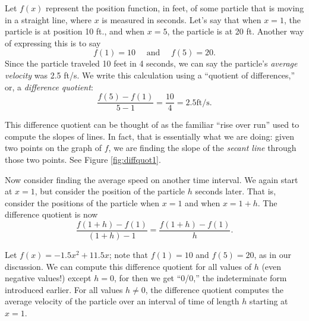 
Let $f(x)$ represent the position function, in feet, of some particle that is moving in a straight line, where $x$ is measured in seconds. Let's say that when $x=1$, the particle is at position 10 ft., and when $x=5$, the particle is at 20 ft. Another way of expressing this is to say $$f(1)=10 \quad \text{ and } \quad f(5) = 20.$$
Since the particle traveled 10 feet in 4 seconds, we can say the particle's \textit{average velocity} was 2.5 ft/s. We write this calculation using a ``quotient of differences,'' or, a \textit{difference quotient}: $$\frac{f(5) - f(1)}{5-1} = \frac{10}4 = 2.5 \text{ft/s}.$$

This difference quotient can be thought of as the familiar ``rise over run'' used to compute the slopes of lines. In fact, that is essentially what we are doing: given two points on the graph of $f$, we are finding the slope of the \textit{secant line} through those two points. See Figure \ref{fig:diffquot1}.

Now consider finding the average speed on another time interval. We again start at $x=1$, but consider the position of the particle $h$ seconds later. That is, consider the positions of the particle when $x=1$ and when $x=1+h$. The difference quotient is now $$\frac{f(1+h)-f(1)}{(1+h)-1} = \frac{f(1+h)-f(1)}h.$$

Let $f(x) = -1.5x^2+11.5x$; note that $f(1)=10$ and $f(5) = 20$, as in our discussion. We can compute this difference quotient for all values of $h$ (even negative values!) except $h=0$, for then we get ``0/0,'' the indeterminate form introduced earlier. For all values $h\neq 0$, the difference quotient computes the average velocity of the particle over an interval of time of length $h$ starting at $x=1$. 

